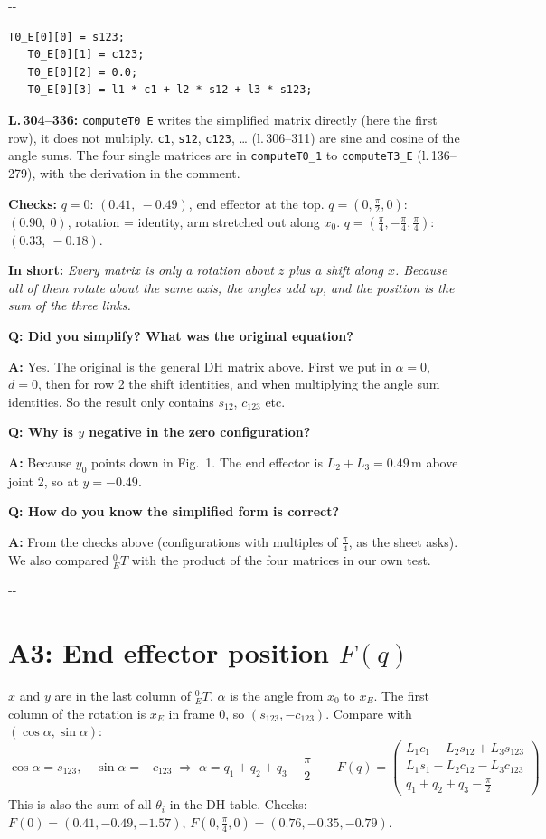 \documentclass[10pt,a4paper]{article}
\makeatletter
\newcommand{\secneed}[1]{\par\penalty\@M\begingroup\setlength{\dimen@}{#1}\dimen@ii\pagegoal
  \advance\dimen@ii-\pagetotal\ifdim\dimen@>\dimen@ii\ifdim\dimen@ii>\z@\vfil\fi\penalty-\@M\fi\endgroup}
\let\oldsection\section
\renewcommand{\section}{\secneed{9\baselineskip}\oldsection}
\newcommand{\frage}[2]{\textbf{Q: #1}\par\nopagebreak\vspace{1pt}\textbf{A:} #2\par\vspace{5pt}}
\newcommand{\sagen}[1]{\textbf{In short:} \emph{#1}\par}
\newcommand{\code}[1]{\texttt{#1}}
\makeatother
\begin{document}
\secneed{5\baselineskip}
\begin{lstlisting}[firstnumber=314]
   T0_E[0][0] = s123;
   T0_E[0][1] = c123;
   T0_E[0][2] = 0.0;
   T0_E[0][3] = l1 * c1 + l2 * s12 + l3 * s123;
\end{lstlisting}
\textbf{L.\,304--336:} \code{computeT0\_E} writes the simplified matrix directly (here the first row), it does not
multiply. \code{c1}, \code{s12}, \code{c123}, \ldots{} (l.\,306--311) are sine and cosine of the angle sums. The four
single matrices are in \code{computeT0\_1} to \code{computeT3\_E} (l.\,136--279), with the derivation in the comment.

\textbf{Checks:} $q = 0$: $(0.41,\ -0.49)$, end effector at the top. $q = (0, \frac{\pi}{2}, 0)$: $(0.90,\ 0)$, rotation =
identity, arm stretched out along $x_0$. $q = (\frac{\pi}{4}, -\frac{\pi}{4}, \frac{\pi}{4})$: $(0.33,\ -0.18)$.

\sagen{Every matrix is only a rotation about $z$ plus a shift along $x$. Because all of them rotate about the same axis,
the angles add up, and the position is the sum of the three links.}

\begin{fragen}
\frage{Did you simplify? What was the original equation?}
{Yes. The original is the general DH matrix above. First we put in $\alpha = 0$, $d = 0$, then for row 2 the shift
identities, and when multiplying the angle sum identities. So the result only contains $s_{12}$, $c_{123}$ etc.}
\frage{Why is $y$ negative in the zero configuration?}
{Because $y_0$ points down in Fig.~1. The end effector is $L_2 + L_3 = 0.49$\,m above joint 2, so at $y = -0.49$.}
\frage{How do you know the simplified form is correct?}
{From the checks above (configurations with multiples of $\frac{\pi}{4}$, as the sheet asks). We also compared
${}^0_ET$ with the product of the four matrices in our own test.}
\end{fragen}

\section{A3: End effector position \texorpdfstring{$F(q)$}{F(q)}}

$x$ and $y$ are in the last column of ${}^0_ET$. $\alpha$ is the angle from $x_0$ to $x_E$. The first column of the
rotation is $x_E$ in frame 0, so $(s_{123}, -c_{123})$. Compare with $(\cos\alpha, \sin\alpha)$:
\[
  \cos\alpha = s_{123},\quad \sin\alpha = -c_{123} \;\Rightarrow\; \alpha = q_1 + q_2 + q_3 - \frac{\pi}{2}
  \qquad
  \boxed{F(q) = \begin{pmatrix}
    L_1 c_1 + L_2 s_{12} + L_3 s_{123} \\
    L_1 s_1 - L_2 c_{12} - L_3 c_{123} \\
    q_1 + q_2 + q_3 - \frac{\pi}{2}
  \end{pmatrix}}
\]
This is also the sum of all $\theta_i$ in the DH table. Checks: $F(0) = (0.41, -0.49, -1.57)$,
$F(0, \frac{\pi}{4}, 0) = (0.76, -0.35, -0.79)$.
\end{document}
